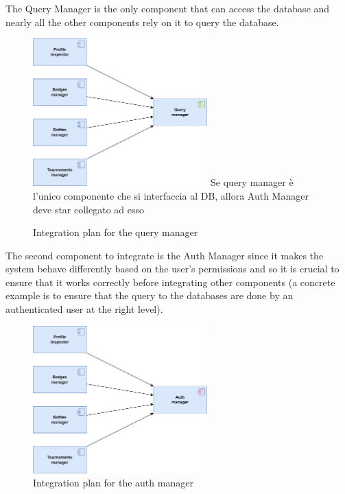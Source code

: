 The Query Manager is the only component that can access the database and nearly all the other components rely on it to query the database. \\
\begin{figure}[H]
    \centering
    \includegraphics[width=0.6\textwidth]{images/test_plan/test-plan-3.png}
    {\color{red} Se query manager è l'unico componente che si interfaccia al DB, allora Auth Manager deve star collegato ad esso}
    \caption{Integration plan for the query manager}
    \label{fig:test-plan-3}
\end{figure}

The second component to integrate is the Auth Manager since it makes the system behave differently based on the user's permissions and so it is crucial to ensure that it works correctly before integrating other components (a concrete example is to ensure that the query to the databases are done by an authenticated user at the right level).\\
\begin{figure}[H]
    \centering
    \includegraphics[width=0.6\textwidth]{images/test_plan/test-plan-2.png}
    \caption{Integration plan for the auth manager}
    \label{fig:test-plan-2}
\end{figure}

